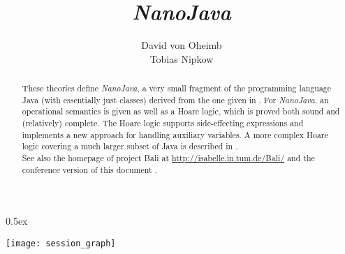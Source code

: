\documentclass[11pt,a4paper]{article}
\newcommand{\nJava}{\it NanoJava}
\begin{document}
\title{\nJava}
\author{David von Oheimb \\ Tobias Nipkow}
\maketitle

\begin{abstract}\noindent
  These theories define {\nJava}, a very small fragment of the programming 
  language Java (with essentially just classes) derived from the one given 
  in \cite{NipkowOP00}.
  For {\nJava}, an operational semantics is given as well as a Hoare logic,
  which is proved both sound and (relatively) complete. 
  The Hoare logic supports side-effecting expressions and
  implements a new approach for handling auxiliary variables.
  A more complex Hoare logic covering a much larger subset of Java is described
  in \cite{DvO-CPE01}.\\
See also the homepage of project Bali at \url{http://isabelle.in.tum.de/Bali/}
and the conference version of this document \cite{NanoJava}.
\end{abstract}

\tableofcontents
\parindent 0pt \parskip 0.5ex

\begin{center}
  \texttt{[image: session\_graph]}  
\end{center}

\newpage


\newpage
\nocite{*}


\end{document}
